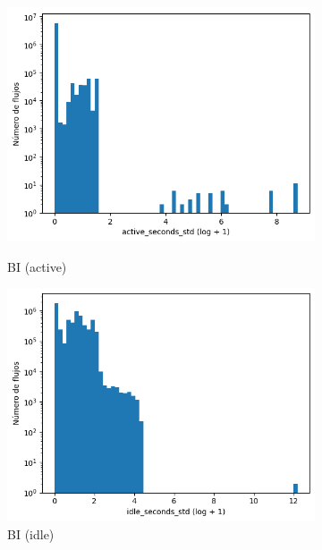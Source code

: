 \begin{figure}[H]
\begin{subfigure}[b]{0.26\textwidth}
    \end{subfigure}
    \hfill
    \begin{subfigure}[b]{0.26\textwidth}
        \centering
        \includegraphics[width=\linewidth]{media/packet_pincer_botiot/active_seconds_std_log_x_log_y.png}
        \caption{BI (active)}
        \includegraphics[width=\linewidth]{media/packet_pincer_botiot/idle_seconds_std_log_x_log_y.png}
        \caption{BI (idle)}
    \end{subfigure}
    \hfill
    \begin{subfigure}[b]{0.26\textwidth}
        \centering

\end{subfigure}
\end{figure}
